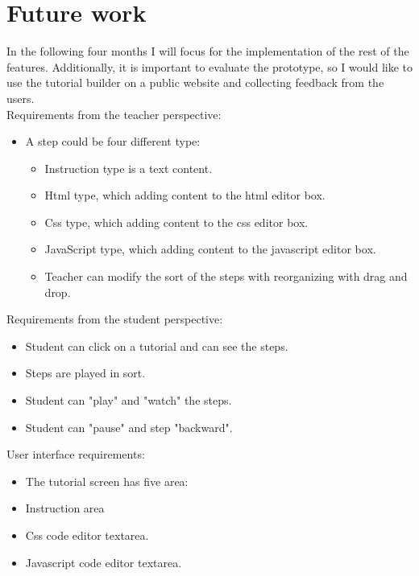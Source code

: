 \documentclass[11pt
              , a4paper
              , twoside
              , openright
              ]{report}
\begin{document}
\section{Future work}

In the following four months I will focus for the implementation of the rest of the features. Additionally, it is important to evaluate the prototype, so I would like to use the tutorial builder on a public website and collecting feedback from the users. \\

\noindent Requirements from the teacher perspective:
\begin{itemize}[noitemsep]
\item A step could be four different type:
\begin{itemize}[noitemsep]
\item Instruction type is a text content.
\item Html type, which adding content to the html editor box.
\item Css type, which adding content to the css editor box.
\item JavaScript type, which adding content to the javascript editor box.
\item Teacher can modify the sort of the steps with reorganizing with drag and drop.
\end{itemize}
\end{itemize}

\noindent Requirements from the student perspective:
\begin{itemize}[noitemsep]
\item Student can click on a tutorial and can see the steps.
\item Steps are played in sort.
\item Student can "play" and "watch" the steps.
\item Student can "pause" and step "backward".
\end{itemize}

\noindent User interface requirements:
\begin{itemize}[noitemsep]
\item The tutorial screen has five area:
\item Instruction area
\item Css code editor textarea.
\item Javascript code editor textarea.
\end{itemize}

\end{document}
